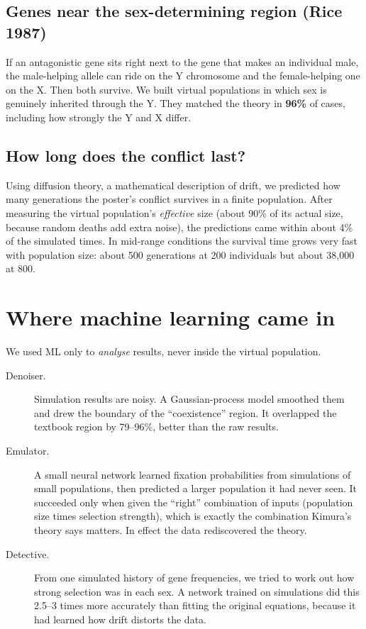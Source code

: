 \documentclass[11pt,a4paper]{article}
\begin{document}
\subsection{Genes near the sex-determining region (Rice 1987)}
If an antagonistic gene sits right next to the gene that makes an individual male, the male-helping allele can ride on the Y chromosome and the female-helping one on the X. Then both survive. We built virtual populations in which sex is genuinely inherited through the Y. They matched the theory in \textbf{96\%} of cases, including how strongly the Y and X differ.

\subsection{How long does the conflict last?}
Using diffusion theory, a mathematical description of drift, we predicted how many generations the poster's conflict survives in a finite population. After measuring the virtual population's \emph{effective} size (about 90\% of its actual size, because random deaths add extra noise), the predictions came within about 4\% of the simulated times. In mid-range conditions the survival time grows very fast with population size: about 500 generations at 200 individuals but about 38{,}000 at 800.

\section{Where machine learning came in}
We used ML only to \emph{analyse} results, never inside the virtual population.
\begin{description}
\item[Denoiser.] Simulation results are noisy. A Gaussian-process model smoothed them and drew the boundary of the ``coexistence'' region. It overlapped the textbook region by 79--96\%, better than the raw results.
\item[Emulator.] A small neural network learned fixation probabilities from simulations of small populations, then predicted a larger population it had never seen. It succeeded only when given the ``right'' combination of inputs (population size times selection strength), which is exactly the combination Kimura's theory says matters. In effect the data rediscovered the theory.
\item[Detective.] From one simulated history of gene frequencies, we tried to work out how strong selection was in each sex. A network trained on simulations did this 2.5--3 times more accurately than fitting the original equations, because it had learned how drift distorts the data.
\end{description}
\end{document}
